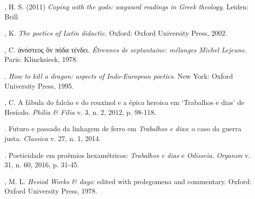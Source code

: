 \begin{bibliohedra}
, H. S. (2011) \emph{Coping with the gods: wayward readings in
Greek theology}. Leiden: Brill

, K. \emph{The poetics of Latin didactic}. Oxford: Oxford University
Press, 2002.

, C. ἀνόστεος ὃν πόδα τένδει. \emph{Étrennes de septantaine:
mélanges Michel Lejeune}. Paris: Klincksieck, 1978.

\titidem. \emph{How to kill a dragon: aspects of Indo-European poetics}. New
York: Oxford University Press, 1995.

, C. A fábula do falcão e do rouxinol e a épica heroica em
`Trabalhos e dias' de Hesíodo. \emph{Philia \& Filia} v. 3, n. 2, 2012,
p. 98-118.

\titidem. Futuro e passado da linhagem de ferro em \emph{Trabalhos e dias}: o
caso da guerra justa. \emph{Classica} v. 27, n. 1, 2014.

\titidem. Poeticidade em proêmios hexamétricos: \emph{Trabalhos e dias} e
\emph{Odisseia}. \emph{Organon} v. 31, n. 60, 2016, p. 31-45.

, M. L. \emph{Hesiod Works \& days:} edited with prolegomena and
commentary. Oxford: Oxford University Press, 1978.
\end{bibliohedra}

